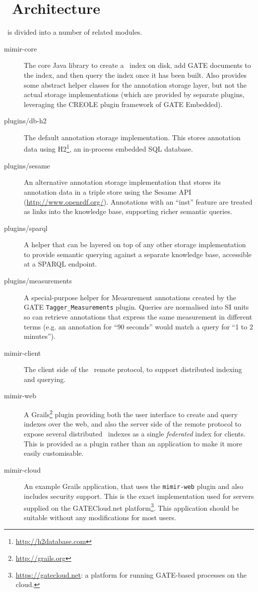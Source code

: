 \section{\Mimir\ Architecture}

\Mimir\ is divided into a number of related modules.

\begin{description}
\item[mimir-core] The core Java library to create a \Mimir\ index on disk, add
GATE documents to the index, and then query the index once it has been built.
Also provides some abstract helper classes for the annotation storage layer,
but not the actual storage implementations (which are provided by separate
plugins, leveraging the CREOLE plugin framework of GATE Embedded).

\item[plugins/db-h2] The default annotation storage implementation.  This
stores annotation data using H2\footnote{\url{http://h2database.com}}, an
in-process embedded SQL database.

\item[plugins/sesame] An alternative annotation storage implementation that
stores its annotation data in a triple store using the Sesame API
(\url{http://www.openrdf.org/}).  Annotations with an ``inst'' feature are
treated as links into the knowledge base, supporting richer semantic queries.

\item[plugins/sparql] A helper that can be layered on top of any other storage
implementation to provide semantic querying against a separate knowledge base,
accessible at a SPARQL endpoint.

\item[plugins/measurements] A special-purpose helper for Measurement
annotations created by the GATE {\tt Tagger\_Measurements} plugin.  Queries are
normalised into SI units so can retrieve annotations that express the same
measurement in different terms (e.g. an annotation for ``90 seconds'' would
match a query for ``1 to 2 minutes'').

\item[mimir-client] The client side of the \Mimir\ remote protocol, to support
distributed indexing and querying.

\item[mimir-web] A Grails\footnote{\url{http://grails.org}} plugin providing
both the user interface to create and query indexes over the web, and also the
server side of the remote protocol to expose several distributed \Mimir\
indexes as a single {\em federated} index for clients.  This is provided as a
plugin rather than an application to make it more easily customisable.

\item[mimir-cloud] An example Grails application, that uses the {\tt mimir-web}
plugin and also includes security support. This is the exact implementation used
for \Mimir{} servers supplied on the GATECloud.net
platform\footnote{\url{https://gatecloud.net}: a platform for running GATE-based
processes on the cloud.}. This application should be suitable without any
modifications for most users.
\end{description}

